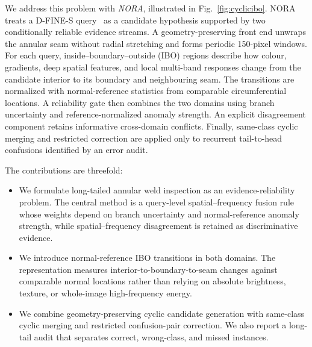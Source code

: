 We address this problem with \emph{NORA}, illustrated in Fig.~\ref{fig:cyclicibo}. NORA treats a D-FINE-S query~\cite{peng2025dfine} as a candidate hypothesis supported by two conditionally reliable evidence streams. A geometry-preserving front end unwraps the annular seam without radial stretching and forms periodic 150-pixel windows. For each query, inside--boundary--outside (IBO) regions describe how colour, gradients, deep spatial features, and local multi-band responses change from the candidate interior to its boundary and neighbouring seam. The transitions are normalized with normal-reference statistics from comparable circumferential locations. A reliability gate then combines the two domains using branch uncertainty and reference-normalized anomaly strength. An explicit disagreement component retains informative cross-domain conflicts. Finally, same-class cyclic merging and restricted correction are applied only to recurrent tail-to-head confusions identified by an error audit.

The contributions are threefold:
\begin{itemize}
    \item We formulate long-tailed annular weld inspection as an evidence-reliability problem. The central method is a query-level spatial--frequency fusion rule whose weights depend on branch uncertainty and normal-reference anomaly strength, while spatial--frequency disagreement is retained as discriminative evidence.
    \item We introduce normal-reference IBO transitions in both domains. The representation measures interior-to-boundary-to-seam changes against comparable normal locations rather than relying on absolute brightness, texture, or whole-image high-frequency energy.
    \item We combine geometry-preserving cyclic candidate generation with same-class cyclic merging and restricted confusion-pair correction. We also report a long-tail audit that separates correct, wrong-class, and missed instances.
\end{itemize}
